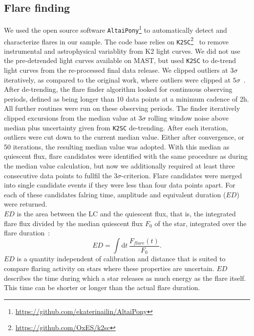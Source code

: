 \documentclass{aa}
\begin{document}
\subsection{Flare finding}
We used the open source software \texttt{AltaiPony}\footnote{\url{https://github.com/ekaterinailin/AltaiPony}} to automatically detect and characterize flares in our sample. The code base relies on \texttt{K2SC}\footnote{\url{https://github.com/OxES/k2sc}}~\citep{aigrain_k2sc_2016} to remove instrumental and astrophysical variablity from K2 light curves. We did not use the pre-detrended light curves available on MAST, but used \texttt{K2SC} to de-trend light curves from the re-processed final data release. We clipped outliers at $3\sigma$ iteratively, as compared to the original work, where outliers were clipped at $5\sigma$~\citep{aigrain_k2sc_2016}.
\\
After de-trending, the flare finder algorithm looked for continuous observing periods, defined as being longer than 10 data points at a minimum cadence of 2\;h. All further routines were run on these observing periods. The finder iteratively clipped excursions from the median value at $3\sigma$ rolling window noise above median plus uncertainty given from \texttt{K2SC} de-trending. After each iteration, outliers were cut down to the current median value. Either after convergence, or 50 iterations, the resulting median value was adopted. With this median as quiescent flux, flare candidates were identified with the same procedure as during the median value calculation, but now we additionally required at least three consecutive data points to fullfil the $3\sigma$-criterion. Flare candidates were merged into single candidate events if they were less than four data points apart. For each of these candidates falring time, amplitude and equivalent duration ($ED$) were returned.
\\
$ED$ is the area between the LC and the quiescent flux, that is, the integrated flare flux divided by the median quiescent flux $F_0$ of the star, integrated over the flare duration~\citep{hunt-walker_most_2012}:
\begin{equation}
\label{05_ED}
ED=\displaystyle \int \mathrm dt\, \frac{F_{flare}(t)}{F_0}.
\end{equation}
$ED$ is a quantity independent of calibration and distance that is suited to compare flaring activity on stars where these properties are uncertain. $ED$ describes the time during which a star releases as much energy as the flare itself. This time can be shorter or longer than the actual flare duration. 
\end{document}
